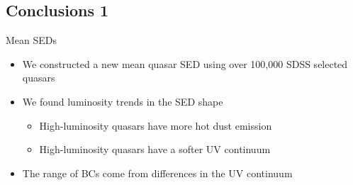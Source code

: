 \documentclass[landscape,9pt]{beamer}
\begin{document}
\subsection{Conclusions 1}
\begin{frame}
	\begin{block}{Mean SEDs}
	\begin{itemize}
		\item<1> We constructed a new mean quasar SED using over 100,000 SDSS selected quasars
		\item<2> We found luminosity trends in the SED shape
		\begin{itemize}
			\item High-luminosity quasars have more hot dust emission
			\item High-luminosity quasars have a softer UV continuum
		\end{itemize}
		\item<3> The range of BCs come from differences in the UV continuum
	\end{itemize}
	\end{block}
\end{frame}	
\end{document}
